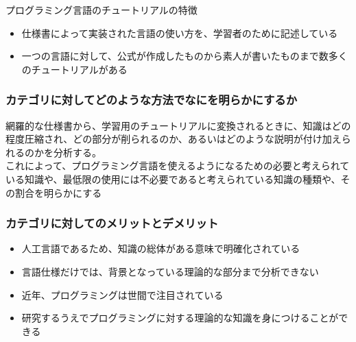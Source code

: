 プログラミング言語のチュートリアルの特徴

\begin{itemize}
\tightlist
\item
  仕様書によって実装された言語の使い方を、学習者のために記述している
\item
  一つの言語に対して、公式が作成したものから素人が書いたものまで数多くのチュートリアルがある
\end{itemize}

\hypertarget{ux30abux30c6ux30b4ux30eaux306bux5bfeux3057ux3066ux3069ux306eux3088ux3046ux306aux65b9ux6cd5ux3067ux306aux306bux3092ux660eux3089ux304bux306bux3059ux308bux304b-1}{%
\subsubsection{カテゴリに対してどのような方法でなにを明らかにするか}\label{ux30abux30c6ux30b4ux30eaux306bux5bfeux3057ux3066ux3069ux306eux3088ux3046ux306aux65b9ux6cd5ux3067ux306aux306bux3092ux660eux3089ux304bux306bux3059ux308bux304b-1}}

網羅的な仕様書から、学習用のチュートリアルに変換されるときに、知識はどの程度圧縮され、どの部分が削られるのか、あるいはどのような説明が付け加えられるのかを分析する。\\
これによって、プログラミング言語を使えるようになるための必要と考えられている知識や、最低限の使用には不必要であると考えられている知識の種類や、その割合を明らかにする

\hypertarget{ux30abux30c6ux30b4ux30eaux306bux5bfeux3057ux3066ux306eux30e1ux30eaux30c3ux30c8ux3068ux30c7ux30e1ux30eaux30c3ux30c8-1}{%
\subsubsection{カテゴリに対してのメリットとデメリット}\label{ux30abux30c6ux30b4ux30eaux306bux5bfeux3057ux3066ux306eux30e1ux30eaux30c3ux30c8ux3068ux30c7ux30e1ux30eaux30c3ux30c8-1}}

\begin{itemize}
\tightlist
\item
  人工言語であるため、知識の総体がある意味で明確化されている
\item
  言語仕様だけでは、背景となっている理論的な部分まで分析できない
\item
  近年、プログラミングは世間で注目されている
\item
  研究するうえでプログラミングに対する理論的な知識を身につけることができる
\end{itemize}

